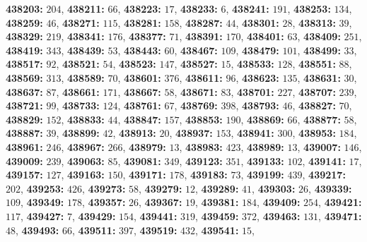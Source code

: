 \textsf{\bfseries 438203:} $204$, \textsf{\bfseries 438211:} $66$, \textsf{\bfseries 438223:} $17$, \textsf{\bfseries 438233:} $6$, \textsf{\bfseries 438241:} $191$, \textsf{\bfseries 438253:} $134$, \textsf{\bfseries 438259:} $46$, \textsf{\bfseries 438271:} $115$, \textsf{\bfseries 438281:} $158$, \textsf{\bfseries 438287:} $44$, \textsf{\bfseries 438301:} $28$, \textsf{\bfseries 438313:} $39$, \textsf{\bfseries 438329:} $219$, \textsf{\bfseries 438341:} $176$, \textsf{\bfseries 438377:} $71$, \textsf{\bfseries 438391:} $170$, \textsf{\bfseries 438401:} $63$, \textsf{\bfseries 438409:} $251$, \textsf{\bfseries 438419:} $343$, \textsf{\bfseries 438439:} $53$, \textsf{\bfseries 438443:} $60$, \textsf{\bfseries 438467:} $109$, \textsf{\bfseries 438479:} $101$, \textsf{\bfseries 438499:} $33$, \textsf{\bfseries 438517:} $92$, \textsf{\bfseries 438521:} $54$, \textsf{\bfseries 438523:} $147$, \textsf{\bfseries 438527:} $15$, \textsf{\bfseries 438533:} $128$, \textsf{\bfseries 438551:} $88$, \textsf{\bfseries 438569:} $313$, \textsf{\bfseries 438589:} $70$, \textsf{\bfseries 438601:} $376$, \textsf{\bfseries 438611:} $96$, \textsf{\bfseries 438623:} $135$, \textsf{\bfseries 438631:} $30$, \textsf{\bfseries 438637:} $87$, \textsf{\bfseries 438661:} $171$, \textsf{\bfseries 438667:} $58$, \textsf{\bfseries 438671:} $83$, \textsf{\bfseries 438701:} $227$, \textsf{\bfseries 438707:} $239$, \textsf{\bfseries 438721:} $99$, \textsf{\bfseries 438733:} $124$, \textsf{\bfseries 438761:} $67$, \textsf{\bfseries 438769:} $398$, \textsf{\bfseries 438793:} $46$, \textsf{\bfseries 438827:} $70$, \textsf{\bfseries 438829:} $152$, \textsf{\bfseries 438833:} $44$, \textsf{\bfseries 438847:} $157$, \textsf{\bfseries 438853:} $190$, \textsf{\bfseries 438869:} $66$, \textsf{\bfseries 438877:} $58$, \textsf{\bfseries 438887:} $39$, \textsf{\bfseries 438899:} $42$, \textsf{\bfseries 438913:} $20$, \textsf{\bfseries 438937:} $153$, \textsf{\bfseries 438941:} $300$, \textsf{\bfseries 438953:} $184$, \textsf{\bfseries 438961:} $246$, \textsf{\bfseries 438967:} $266$, \textsf{\bfseries 438979:} $13$, \textsf{\bfseries 438983:} $423$, \textsf{\bfseries 438989:} $13$, \textsf{\bfseries 439007:} $146$, \textsf{\bfseries 439009:} $239$, \textsf{\bfseries 439063:} $85$, \textsf{\bfseries 439081:} $349$, \textsf{\bfseries 439123:} $351$, \textsf{\bfseries 439133:} $102$, \textsf{\bfseries 439141:} $17$, \textsf{\bfseries 439157:} $127$, \textsf{\bfseries 439163:} $150$, \textsf{\bfseries 439171:} $178$, \textsf{\bfseries 439183:} $73$, \textsf{\bfseries 439199:} $439$, \textsf{\bfseries 439217:} $202$, \textsf{\bfseries 439253:} $426$, \textsf{\bfseries 439273:} $58$, \textsf{\bfseries 439279:} $12$, \textsf{\bfseries 439289:} $41$, \textsf{\bfseries 439303:} $26$, \textsf{\bfseries 439339:} $109$, \textsf{\bfseries 439349:} $178$, \textsf{\bfseries 439357:} $26$, \textsf{\bfseries 439367:} $19$, \textsf{\bfseries 439381:} $184$, \textsf{\bfseries 439409:} $254$, \textsf{\bfseries 439421:} $117$, \textsf{\bfseries 439427:} $7$, \textsf{\bfseries 439429:} $154$, \textsf{\bfseries 439441:} $319$, \textsf{\bfseries 439459:} $372$, \textsf{\bfseries 439463:} $131$, \textsf{\bfseries 439471:} $48$, \textsf{\bfseries 439493:} $66$, \textsf{\bfseries 439511:} $397$, \textsf{\bfseries 439519:} $432$, \textsf{\bfseries 439541:} $15$, 
